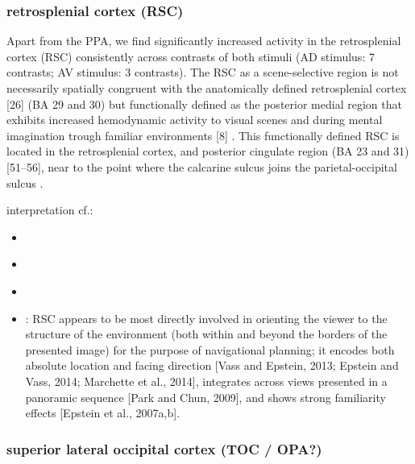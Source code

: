 \documentclass[english]{article}
\begin{document}
\subsubsection{retrosplenial cortex (RSC)}

Apart from the PPA, we find significantly increased activity in the
retrosplenial cortex (RSC) consistently across contrasts of both stimuli (AD
stimulus: 7 contrasts; AV stimulus: 3 contrasts).
The RSC as a scene-selective region is not necessarily spatially congruent with
the anatomically defined retrosplenial cortex [26] (BA 29 and 30)
\citep{epstein2008parahippocampal} but functionally defined as the posterior
medial region that exhibits increased hemodynamic activity to visual scenes and
during mental imagination trough familiar environments [8]
\citep{epstein2008parahippocampal}.
This functionally defined RSC is located in the retrosplenial cortex, and
posterior cingulate region (BA 23 and 31) [51–56], near to the point where the
calcarine sulcus joins the parietal-occipital sulcus
\citep{epstein2008parahippocampal}.

interpretation cf.:
\begin{itemize}
    \item \citep{chrastil2018heterogeneity}
    \item \citep{vann2009what}
    \item \citep{silson2019posterior}
    \item \citep{baldassano2016two}: RSC appears to be most directly involved in orienting the viewer to the structure of the environment (both within and beyond the borders of the presented image) for the purpose of navigational planning; it encodes both absolute location and facing direction [Vass and Epstein, 2013; Epstein and Vass, 2014; Marchette et al., 2014], integrates across views presented in a panoramic sequence [Park and Chun, 2009], and shows strong familiarity effects [Epstein et al., 2007a,b].
\end{itemize}


\subsubsection{superior lateral occipital cortex (TOC / OPA?)}
\end{document}
